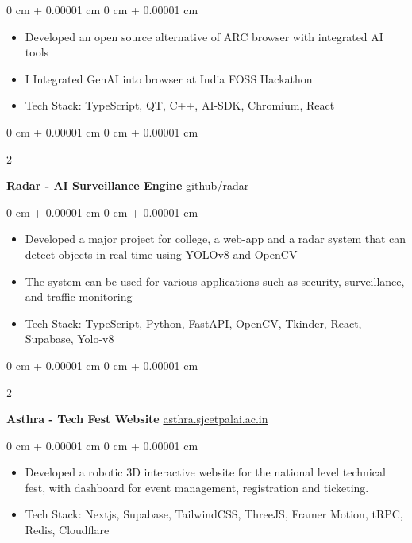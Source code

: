 \documentclass[10pt, letterpaper]{article}
\newenvironment{highlights}{
    \begin{itemize}[
        topsep=0.10 cm,
        parsep=0.10 cm,
        partopsep=0pt,
        itemsep=0pt,
        leftmargin=0 cm + 10pt
    ]
}{
    \end{itemize}
} %
\newenvironment{onecolentry}{
    \begin{adjustwidth}{
        0 cm + 0.00001 cm
    }{
        0 cm + 0.00001 cm
    }
}{
    \end{adjustwidth}
} %
\newenvironment{twocolentry}[2][]{
    \onecolentry
    \def\secondColumn{#2}
    \setcolumnwidth{\fill, 4.5 cm}
    \begin{paracol}{2}
}{
    \switchcolumn \raggedleft \secondColumn
    \end{paracol}
    \endonecolentry
} %
\begin{document}
\vspace{0.10 cm}
\begin{onecolentry}
	\begin{highlights}
		\item Developed an open source alternative of ARC browser with integrated AI tools
		\item I Integrated GenAI into browser at India FOSS Hackathon
		\item Tech Stack: TypeScript, QT, C++, AI-SDK, Chromium, React
	\end{highlights}
\end{onecolentry}

\vspace{0.2 cm}

\begin{twocolentry}{
		\href{https://github.com/rajatsandeepsen/radar}{github/radar}
	}
	\textbf{Radar - AI Surveillance Engine}\end{twocolentry}

\vspace{0.10 cm}
\begin{onecolentry}
	\begin{highlights}
		\item Developed a major project for college, a web-app and a radar system that can
		detect objects in real-time using YOLOv8 and OpenCV
		\item The system can be used for various applications such as security, surveillance,
		and traffic monitoring
		\item Tech Stack: TypeScript, Python, FastAPI, OpenCV, Tkinder, React, Supabase,
		Yolo-v8
	\end{highlights}
\end{onecolentry}

\vspace{0.2 cm}

\begin{twocolentry}{
		\href{https://asthra.sjcetpalai.ac.in}{asthra.sjcetpalai.ac.in}
	}
	\textbf{Asthra - Tech Fest Website}\end{twocolentry}

\vspace{0.10 cm}
\begin{onecolentry}
	\begin{highlights}
		\item Developed a robotic 3D interactive website for the national level technical
		fest, with dashboard for event management, registration and ticketing.
		\item Tech Stack: Nextjs, Supabase, TailwindCSS, ThreeJS, Framer Motion, tRPC, Redis,
		Cloudflare
	\end{highlights}
\end{onecolentry}
\end{document}
